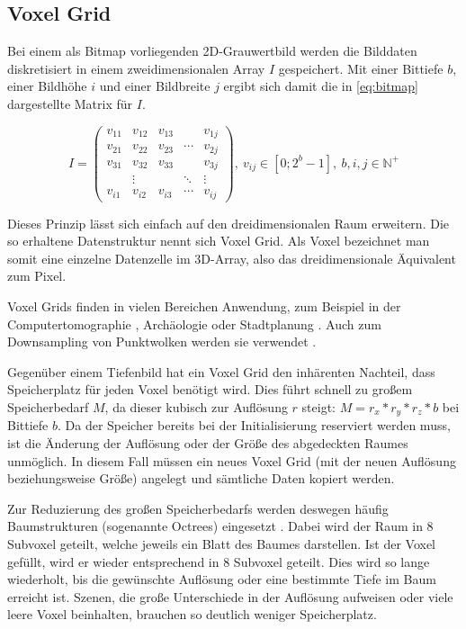 \subsection{Voxel Grid}
\label{subsec:voxel-grid}

Bei einem als Bitmap vorliegenden 2D-Grauwertbild werden die Bilddaten diskretisiert in einem zweidimensionalen Array $I$ gespeichert.
Mit einer Bittiefe $b$, einer Bildhöhe $i$ und einer Bildbreite $j$ ergibt sich damit die in \autoref{eq:bitmap} dargestellte Matrix für $I$.

\begin{equation}
I = \begin{pmatrix}
v_{11} & v_{12} & v_{13} &        & v_{1j}\\
v_{21} & v_{22} & v_{23} & \cdots & v_{2j}\\
v_{31} & v_{32} & v_{33} &        & v_{3j}\\
       & \vdots &        & \ddots & \vdots\\
v_{i1} & v_{i2} & v_{i3} & \cdots & v_{ij}
\end{pmatrix},\ v_{ij} \in [0; 2^b - 1],\ b, i, j \in \mathbb{N}^+
\label{eq:bitmap}
\end{equation}

Dieses Prinzip lässt sich einfach auf den dreidimensionalen Raum erweitern.
Die so erhaltene Datenstruktur nennt sich Voxel Grid.
Als Voxel bezeichnet man somit eine einzelne Datenzelle im 3D-Array, also das dreidimensionale Äquivalent zum Pixel.

Voxel Grids finden in vielen Bereichen Anwendung, zum Beispiel in der Computertomographie \cite[15]{carr1996surface}, Archäologie oder Stadtplanung \cite{chmielewski2017estimating}.
Auch zum Downsampling von Punktwolken werden sie verwendet \cite{pclVoxelGrid}.

Gegenüber einem Tiefenbild hat ein Voxel Grid den inhärenten Nachteil, dass Speicherplatz für jeden Voxel benötigt wird.
Dies führt schnell zu großem Speicherbedarf $M$, da dieser kubisch zur Auflösung $r$ steigt: $M = r_x * r_y * r_z * b$ bei Bittiefe $b$.
Da der Speicher bereits bei der Initialisierung reserviert werden muss, ist die Änderung der Auflösung oder der Größe des abgedeckten Raumes unmöglich.
In diesem Fall müssen ein neues Voxel Grid (mit der neuen Auflösung beziehungsweise Größe) angelegt und sämtliche Daten kopiert werden.

Zur Reduzierung des großen Speicherbedarfs werden deswegen häufig Baumstrukturen (sogenannte Octrees) eingesetzt \cite{meagher1982efficient}.
Dabei wird der Raum in 8 Subvoxel geteilt, welche jeweils ein Blatt des Baumes darstellen.
Ist der Voxel gefüllt, wird er wieder entsprechend in 8 Subvoxel geteilt.
Dies wird so lange wiederholt, bis die gewünschte Auflösung oder eine bestimmte Tiefe im Baum erreicht ist.
Szenen, die große Unterschiede in der Auflösung aufweisen oder viele leere Voxel beinhalten, brauchen so deutlich weniger Speicherplatz.

